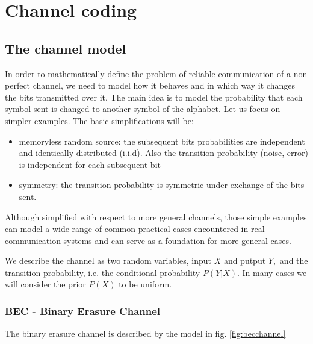 \chapter{Channel coding}
\section{The channel model}

In order to mathematically define the problem of reliable communication of a non perfect channel, we need to model how it behaves and in which way it changes the bits transmitted over it. The main idea is to model the probability that each symbol sent is changed to another symbol of the alphabet. Let us focus on simpler examples. The basic simplifications will be:
\begin{itemize}
	\item memoryless random source: the subsequent bits probabilities are independent and identically distributed (i.i.d). Also the transition probability (noise, error) is independent for each subsequent bit	
	\item symmetry: the transition probability is symmetric under exchange of the bits sent.
\end{itemize}

Although simplified with respect to more general channels, those simple examples can model a wide range of common practical cases encountered in real communication systems and can serve as a foundation for more general cases.

We describe the channel as two random variables, input $X$ and putput $Y, $ and the transition probability, i.e. the conditional probability $P(Y|X)$. In many cases we will consider the prior $P(X)$ to be uniform. 

\subsection*{BEC - Binary Erasure Channel}

The binary erasure channel is described by the model in fig. \ref{fig:becchannel}

